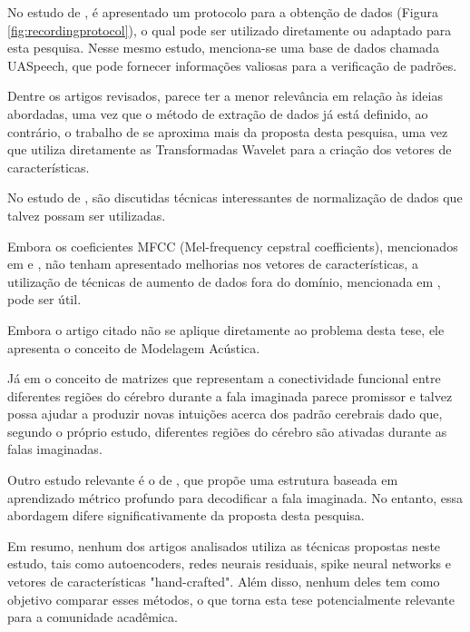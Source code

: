 \documentclass[a4paper,12pt,openright,oneside]{book}
\newenvironment{myenv}[1]
  {\begin{spacing}{#1}}
  {\end{spacing}}
\begin{document}
\begin{myenv}{1.5}
					\par No estudo de \cite{tamm2020classification}, é apresentado um protocolo para a obtenção de dados (Figura \ref{fig:recordingprotocol}), o qual pode ser utilizado diretamente ou adaptado para esta pesquisa. Nesse mesmo estudo, menciona-se uma base de dados chamada UASpeech, que pode fornecer informações valiosas para a verificação de padrões.
					
					\par Dentre os artigos revisados, \cite{WOS:000614122200021} parece ter a menor relevância em relação às ideias abordadas, uma vez que o método de extração de dados já está definido, ao contrário, o trabalho de \cite{WOS:000591530700001} se aproxima mais da proposta desta pesquisa, uma vez que utiliza diretamente as Transformadas Wavelet para a criação dos vetores de características.
					
					\par No estudo de \cite{WOS:000857544900001}, são discutidas técnicas interessantes de normalização de dados que talvez possam ser utilizadas.
					
					Embora os coeficientes MFCC (Mel-frequency cepstral coefficients), mencionados em \cite{furlan2021caracterizacao} e \cite{salim2023automatic}, não tenham apresentado melhorias nos vetores de características, a utilização de técnicas de aumento de dados fora do domínio, mencionada em \cite{salim2023automatic}, pode ser útil.
					
					\par Embora o artigo citado \cite{6296526} não se aplique diretamente ao problema desta tese, ele apresenta o conceito de Modelagem Acústica.
					
					\par Já em \cite{bakhshali2022investigating} o conceito de matrizes que representam a conectividade funcional entre diferentes regiões do cérebro durante a fala imaginada parece promissor e talvez possa ajudar a produzir novas intuições acerca dos padrão cerebrais dado que, segundo o próprio estudo, diferentes regiões do cérebro são ativadas durante as falas imaginadas.
					
					\par Outro estudo relevante é o de \cite{lee2021decoding}, que propõe uma estrutura baseada em aprendizado métrico profundo para decodificar a fala imaginada. No entanto, essa abordagem difere significativamente da proposta desta pesquisa.
					
					\par Em resumo, nenhum dos artigos analisados utiliza as técnicas propostas neste estudo, tais como autoencoders, redes neurais residuais, spike neural networks e vetores de características "hand-crafted". Além disso, nenhum deles tem como objetivo comparar esses métodos, o que torna esta tese potencialmente relevante para a comunidade acadêmica.
				

\end{myenv}
\end{document}
